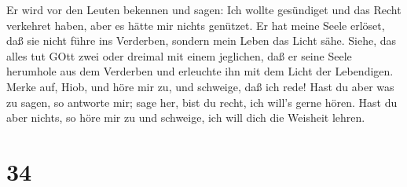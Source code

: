  Er wird vor den Leuten bekennen und sagen: Ich wollte
gesündiget und das Recht verkehret haben, aber es hätte mir nichts
genützet.  Er hat meine Seele erlöset, daß sie nicht führe
ins Verderben, sondern mein Leben das Licht sähe.  Siehe,
das alles tut GOtt zwei oder dreimal mit einem jeglichen, 
daß er seine Seele herumhole aus dem Verderben und erleuchte ihn mit dem
Licht der Lebendigen.  Merke auf, Hiob, und höre mir zu,
und schweige, daß ich rede!  Hast du aber was zu sagen, so
antworte mir; sage her, bist du recht, ich will's gerne hören.
 Hast du aber nichts, so höre mir zu und schweige, ich will
dich die Weisheit lehren.

\hypertarget{section-33}{%
\section{34}\label{section-33}}

